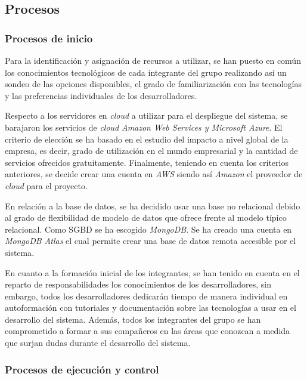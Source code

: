 \documentclass{article}
\begin{document}
\subsection{Procesos}

\subsubsection{Procesos de inicio}

Para la identificación y asignación de recursos a utilizar, se han puesto en común los conocimientos
tecnológicos de cada integrante del grupo realizando así un sondeo de las opciones disponibles, el 
grado de familiarización con las tecnologías y las preferencias individuales de los desarrolladores. 

Respecto a los servidores en \textit{cloud} a utilizar para el despliegue del sistema, se barajaron
los servicios de \textit{cloud} \textit{Amazon Web Services y Microsoft Azure}.
El criterio de elección se ha basado en el estudio del impacto a nivel global de la empresa, es decir,
grado de utilización en el mundo empresarial y la cantidad de servicios ofrecidos gratuitamente.
Finalmente, teniendo en cuenta los criterios anteriores, se decide crear una cuenta en \textit{AWS} 
siendo así \textit{Amazon} el proveedor de \textit{cloud} para el proyecto.

\pagebreak
En relación a la base de datos, se ha decidido usar una base no relacional debido al grado de flexibilidad
de modelo de datos que ofrece frente al modelo típico relacional. Como SGBD se ha escogido \textit{MongoDB}.
Se ha creado una cuenta en \textit{MongoDB Atlas} el cual permite crear una base de datos remota accesible
por el sistema.

En cuanto a la formación inicial de los integrantes, se han tenido en cuenta en el reparto de responsabilidades 
los conocimientos de los desarrolladores, sin embargo, todos los desarrolladores dedicarán tiempo de manera individual 
en autoformación con tutoriales y documentación sobre las tecnologías a usar en el desarrollo del sistema.
Además, todos los integrantes del grupo se han comprometido a formar a sus compañeros en las áreas que conozcan
a medida que surjan dudas durante el desarrollo del sistema.


\subsubsection{Procesos de ejecución y control}
\end{document}
